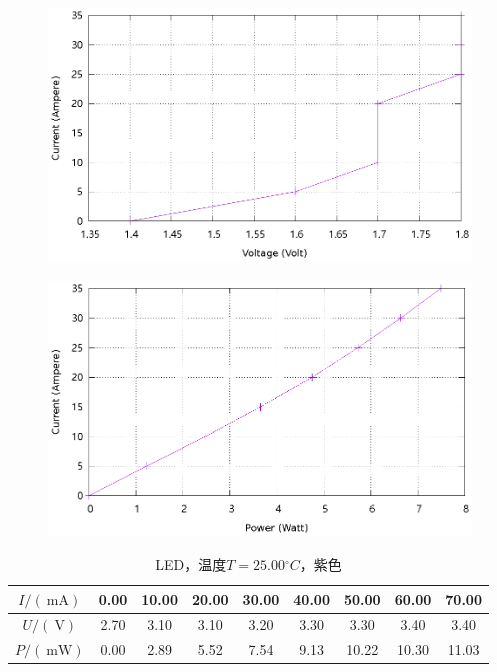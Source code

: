 \documentclass{ctexart}
\newcommand{\si}[1]{\  \mathrm{#1}}
\begin{document}
\begin{figure}[H]
    \centering
    \includegraphics[width=0.9\linewidth]{../output/led-vc-1.gnuplot}
\end{figure}
\begin{figure}[H]
    \centering
    \includegraphics[width=0.9\linewidth]{../output/led-pc-1.gnuplot}
\end{figure}
\newpage
\begin{table}[H]
    \centering
    \begin{tabular}{|c|c|c|c|c|c|c|c|c|}
        \hline
        $I/(\si{mA})$   & 0.00 & 10.00 & 20.00 & 30.00 & 40.00 & 50.00 & 60.00 & 70.00 \\\hline
        $U / (\si{V})$  & 2.70 & 3.10 & 3.10 & 3.20 & 3.30 & 3.30 & 3.40 & 3.40 \\\hline
        $P / (\si{mW})$ & 0.00 & 2.89 & 5.52 & 7.54 & 9.13 & 10.22 & 10.30 & 11.03 \\\hline
    \end{tabular}
    \caption{LED，温度$T=25.00{}^{\circ}C$，紫色}
\end{table}
\end{document}
